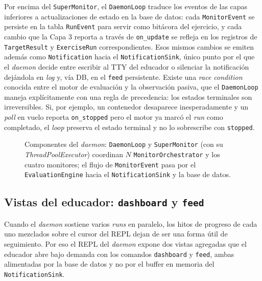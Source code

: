 Por encima del \texttt{SuperMonitor}, el \texttt{DaemonLoop} traduce los eventos
de las capas inferiores a actualizaciones de estado en la base de datos: cada
\texttt{MonitorEvent} se persiste en la tabla \texttt{RunEvent} para servir como
bitácora del ejercicio, y cada cambio que la Capa 3 reporta a través de
\texttt{on\_update} se refleja en los registros de \texttt{TargetResult} y
\texttt{ExerciseRun} correspondientes. Esos mismos cambios se emiten además
como \texttt{Notification} hacia el \texttt{NotificationSink}, único punto por
el que el \textit{daemon} decide entre escribir al TTY del educador o silenciar
la notificación dejándola en \textit{log} y, vía DB, en el \texttt{feed}
persistente. Existe una \textit{race condition} conocida entre el motor de
evaluación y la observación pasiva, que el
\texttt{DaemonLoop} maneja explícitamente con una regla de precedencia: los
estados terminales son irreversibles. Si, por ejemplo, un contenedor desaparece
inesperadamente y un \textit{poll} en vuelo reporta
\texttt{on\_stopped} pero el motor ya marcó el \textit{run} como completado, el
\textit{loop} preserva el estado terminal y no lo sobrescribe con
\texttt{stopped}.

\begin{figure}[H]
    \centering
    \resizebox{\textwidth}{!}{}
    \caption[Componentes del \textit{daemon}]{Componentes del \textit{daemon}:
    \texttt{DaemonLoop} y \texttt{SuperMonitor} (con su
    \textit{ThreadPoolExecutor}) coordinan $N$ \texttt{MonitorOrchestrator}
    y los cuatro monitores; el flujo de \texttt{MonitorEvent} pasa por el
    \texttt{EvaluationEngine} hacia el \texttt{NotificationSink} y la base de
    datos.}
    \label{fig:componentes-daemon}
\end{figure}

\subsection{Vistas del educador: \texttt{dashboard} y \texttt{feed}}

Cuando el \textit{daemon} sostiene varios \textit{runs} en paralelo, los hitos
de progreso de cada uno mezclados sobre el cursor del REPL dejan de ser una
forma útil de seguimiento. Por eso el REPL del \textit{daemon} expone dos vistas
agregadas que el educador abre bajo demanda con los comandos \texttt{dashboard}
y \texttt{feed}, ambas alimentadas por la base de datos y no por el buffer en
memoria del \texttt{NotificationSink}.

